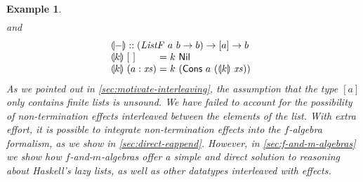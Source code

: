 \documentclass{jfp1}
\newcommand{\fold}[1]{\llparenthesis #1 \rrparenthesis}
\newtheorem{example}{Example}
\begin{document}
\begin{example}
\begin{displaymath}
\begin{array}{l}
    \end{array}
  \end{displaymath}
  and
  \begin{displaymath}
    \begin{array}[t]{l}
      \fold{-} :: (\mathit{ListF}~a~b \to b) \to [a] \to b \\
      \begin{array}{@{}l@{\hspace{0.3em}}l@{\hspace{0.3em}}c@{\hspace{0.3em}}l}
        \fold{k}&[~]&=&k~\mathsf{Nil} \\
        \fold{k}&(a : \mathit{xs})&=&k~(\mathsf{Cons}~a~(\fold{k}~\mathit{xs}))
      \end{array}
    \end{array}
  \end{displaymath}
  As we pointed out in \autoref{sec:motivate-interleaving}, the
  assumption that the type $[a]$ only contains finite lists is
  unsound. We have failed to account for the possibility of
  non-termination effects interleaved between the elements of the
  list. With extra effort, it is possible to integrate non-termination
  effects into the $f$-algebra formalism, as we show in
  \autoref{sec:direct-eappend}. However, in
  \autoref{sec:f-and-m-algebras} we show how $f$-and-$m$-algebras
  offer a simple and direct solution to reasoning about Haskell's lazy
  lists, as well as other datatypes interleaved with effects.
\end{example}
\end{document}
